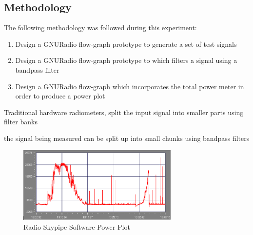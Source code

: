 \documentclass[runningheads,a4paper]{llncs}
\begin{document}
\subsection*{Methodology}
The following methodology was followed during this experiment:

\begin{enumerate}
	\item Design a GNURadio flow-graph prototype to generate a set of test signals
	\item Design a GNURadio flow-graph prototype to which filters a signal using a bandpass filter
	\item Design a GNURadio flow-graph which incorporates the total power meter in order to produce a power plot
\end{enumerate}

Traditional hardware radiometers, split the input signal into smaller parts using filter banks

 the signal being measured can be split up into small chunks using bandpass filters


%
\begin{figure}[!htb]
	\centering
	\includegraphics[width=8cm]{images/18}
	\caption{Radio Skypipe Software Power Plot \citep{rsp-15}}
	\label{fig:radio_skypipe_power_plot}
\end{figure}
%
\end{document}
